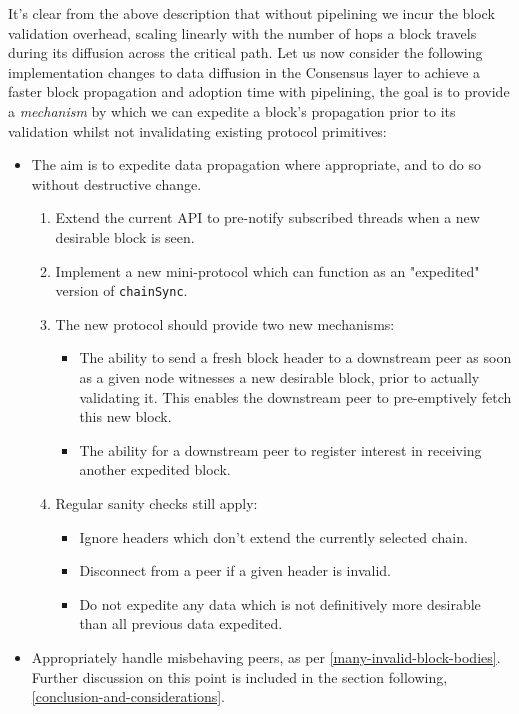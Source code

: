\documentclass[11pt,a4paper]{article}
\begin{document}
It's clear from the above description that without pipelining we incur the block validation overhead,
scaling linearly with the number of hops a block travels during its diffusion across the critical path.
Let us now consider the following implementation changes to data diffusion in the Consensus layer to achieve
a faster block propagation and adoption time with pipelining, the goal is to provide a \emph{mechanism} by which we 
can expedite a block's propagation prior to its validation whilst not invalidating existing protocol primitives:

\begin{itemize}
  \item The aim is to expedite data propagation where appropriate, and to do so without destructive change.
  \begin{enumerate}
    \item Extend the current API to pre-notify subscribed threads when a new desirable block is seen.
    \item Implement a new mini-protocol which can function as an "expedited" version of \lstinline{chainSync}.
    \item The new protocol should provide two new mechanisms:
    \begin{itemize}
      \item The ability to send a fresh block header to a downstream peer as soon as a given node witnesses a new desirable block, prior to actually validating it. This enables the downstream peer to pre-emptively fetch this new block.
      \item The ability for a downstream peer to register interest in receiving another expedited block. 
    \end{itemize}
    \item Regular sanity checks still apply:
    \begin{itemize}
      \item Ignore headers which don't extend the currently selected chain.
      \item Disconnect from a peer if a given header is invalid.
      \item Do not expedite any data which is not definitively more desirable than all previous data expedited. 
    \end{itemize} 
  \end{enumerate}
  \item Appropriately handle misbehaving peers, as per \cref{many-invalid-block-bodies}. Further discussion on this point is included in the section following, \cref{conclusion-and-considerations}.
\end{itemize}
  
\end{document}
